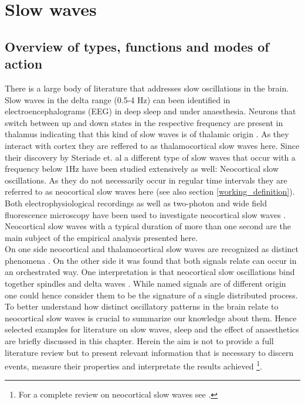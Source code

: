 
\chapter{Slow waves} %

\label{Chapter2} %
\label{review} %



\section{Overview of types, functions and modes of action}
\label{overview_of_functions_and_types}
There is a large body of literature that addresses slow oscillations in the brain. Slow waves in the delta range (0.5-4 Hz) can been identified in electroencephalograms (EEG) in deep sleep and under anaesthesia. Neurons that switch between up and down states in the respective frequency are present in thalamus indicating that this kind of slow waves is of thalamic origin \parencite[1110]{brown2012control}. As they interact with cortex they are reffered to as thalamocortical slow waves here. Since their discovery by Steriade et. al \parencite*{steriade1993novel} a different type of slow waves that occur with a frequency below 1Hz have been studied extensively as well: Neocortical slow oscillations. As they do not necessarily occur in regular time intervals they are referred to as neocortical slow waves here (see also section \ref{working_definition}). Both electrophysiological recordings as well as two-photon and wide field fluorescence microscopy have been used to investigate neocortical slow waves \parencite{niethard2018cortical, celotto2020analysis}. Neocortical slow waves with a typical duration of more than one second are the main subject of the empirical analysis presented here.\\
 On one side neocortical and thalamocortical slow waves are recognized as distinct phenomena \parencite[p. 1110]{brown2012control}. On the other side it was found that both signals relate can occur in an orchestrated way. One interpretation is that neocortical slow oscillations bind together spindles and delta waves \parencite[p. 1110]{brown2012control}. While named signals are of different origin one could hence consider them to be the signature of a single distributed process. To better understand how distinct oscillatory patterns in the brain relate to neocortical slow waves is crucial to summarize our knowledge about them. Hence selected examples for literature on slow waves, sleep and the effect of anaesthetics are briefly discussed in this chapter. Herein the aim is not to provide a full literature review but to present relevant information that is necessary to discern events, measure their properties and interpretate the results achieved \footnote{For a complete review on neocortical slow waves see \parencite{neske2016slow}.}.\\
